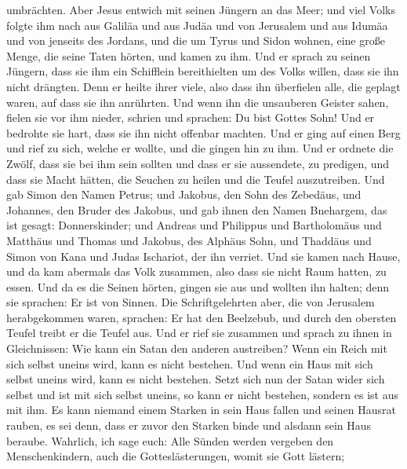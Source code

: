 umbrächten.  Aber Jesus entwich mit seinen Jüngern an das
Meer; und viel Volks folgte ihm nach aus Galiläa und aus Judäa
 und von Jerusalem und aus Idumäa und von jenseits des
Jordans, und die um Tyrus und Sidon wohnen, eine große Menge, die seine
Taten hörten, und kamen zu ihm.  Und er sprach zu seinen
Jüngern, dass sie ihm ein Schifflein bereithielten um des Volks willen,
dass sie ihn nicht drängten.  Denn er heilte ihrer viele,
also dass ihn überfielen alle, die geplagt waren, auf dass sie ihn
anrührten.  Und wenn ihn die unsauberen Geister sahen,
fielen sie vor ihm nieder, schrien und sprachen: Du bist Gottes Sohn!
 Und er bedrohte sie hart, dass sie ihn nicht offenbar
machten.  Und er ging auf einen Berg und rief zu sich,
welche er wollte, und die gingen hin zu ihm.  Und er
ordnete die Zwölf, dass sie bei ihm sein sollten und dass er sie
aussendete, zu predigen,  und dass sie Macht hätten, die
Seuchen zu heilen und die Teufel auszutreiben.  Und gab
Simon den Namen Petrus;  und Jakobus, den Sohn des
Zebedäus, und Johannes, den Bruder des Jakobus, und gab ihnen den Namen
Bnehargem, das ist gesagt: Donnerskinder;  und Andreas und
Philippus und Bartholomäus und Matthäus und Thomas und Jakobus, des
Alphäus Sohn, und Thaddäus und Simon von Kana  und Judas
Ischariot, der ihn verriet.  Und sie kamen nach Hause, und
da kam abermals das Volk zusammen, also dass sie nicht Raum hatten, zu
essen.  Und da es die Seinen hörten, gingen sie aus und
wollten ihn halten; denn sie sprachen: Er ist von Sinnen. 
Die Schriftgelehrten aber, die von Jerusalem herabgekommen waren,
sprachen: Er hat den Beelzebub, und durch den obersten Teufel treibt er
die Teufel aus.  Und er rief sie zusammen und sprach zu
ihnen in Gleichnissen: Wie kann ein Satan den anderen austreiben?
 Wenn ein Reich mit sich selbst uneins wird, kann es nicht
bestehen.  Und wenn ein Haus mit sich selbst uneins wird,
kann es nicht bestehen.  Setzt sich nun der Satan wider
sich selbst und ist mit sich selbst uneins, so kann er nicht bestehen,
sondern es ist aus mit ihm.  Es kann niemand einem Starken
in sein Haus fallen und seinen Hausrat rauben, es sei denn, dass er
zuvor den Starken binde und alsdann sein Haus beraube. 
Wahrlich, ich sage euch: Alle Sünden werden vergeben den
Menschenkindern, auch die Gotteslästerungen, womit sie Gott lästern;
